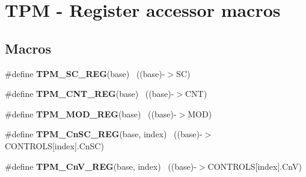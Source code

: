\hypertarget{group___t_p_m___register___accessor___macros}{}\section{T\+P\+M -\/ Register accessor macros}
\label{group___t_p_m___register___accessor___macros}
\subsection*{Macros}
\begin{DoxyCompactItemize}
\item 
\hypertarget{group___t_p_m___register___accessor___macros_ga28177fdb6d1afe4118a0f122775e6203}{}\#define {\bfseries T\+P\+M\+\_\+\+S\+C\+\_\+\+R\+E\+G}(base)                                              ~((base)-\/$>$S\+C)\label{group___t_p_m___register___accessor___macros_ga28177fdb6d1afe4118a0f122775e6203}

\item 
\hypertarget{group___t_p_m___register___accessor___macros_ga3530b221c9c2d64e2bf646fab601a7a8}{}\#define {\bfseries T\+P\+M\+\_\+\+C\+N\+T\+\_\+\+R\+E\+G}(base)                                            ~((base)-\/$>$C\+N\+T)\label{group___t_p_m___register___accessor___macros_ga3530b221c9c2d64e2bf646fab601a7a8}

\item 
\hypertarget{group___t_p_m___register___accessor___macros_gae62e8c6c02bc1521306f444fa4b3bc11}{}\#define {\bfseries T\+P\+M\+\_\+\+M\+O\+D\+\_\+\+R\+E\+G}(base)                                            ~((base)-\/$>$M\+O\+D)\label{group___t_p_m___register___accessor___macros_gae62e8c6c02bc1521306f444fa4b3bc11}

\item 
\hypertarget{group___t_p_m___register___accessor___macros_ga612e0c2a24983917789f2aed9f2da10f}{}\#define {\bfseries T\+P\+M\+\_\+\+Cn\+S\+C\+\_\+\+R\+E\+G}(base,  index)                              ~((base)-\/$>$C\+O\+N\+T\+R\+O\+L\+S\mbox{[}index\mbox{]}.Cn\+S\+C)\label{group___t_p_m___register___accessor___macros_ga612e0c2a24983917789f2aed9f2da10f}

\item 
\hypertarget{group___t_p_m___register___accessor___macros_ga50a6b115bed330d80e9ffe89ddcf316b}{}\#define {\bfseries T\+P\+M\+\_\+\+Cn\+V\+\_\+\+R\+E\+G}(base,  index)                                ~((base)-\/$>$C\+O\+N\+T\+R\+O\+L\+S\mbox{[}index\mbox{]}.Cn\+V)\label{group___t_p_m___register___accessor___macros_ga50a6b115bed330d80e9ffe89ddcf316b}


\end{DoxyCompactItemize}
